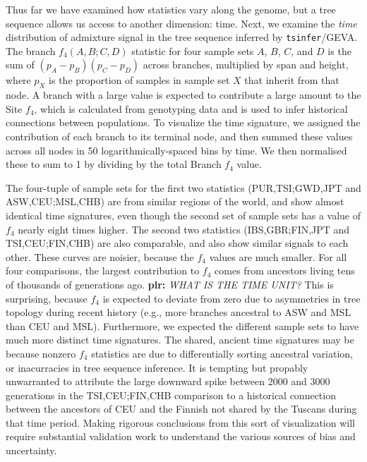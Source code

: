\documentclass{article}
\newcommand{\tsinfer}{{\texttt{tsinfer}}}
\newcommand{\plr}[1]{{\color{blue}\textbf{plr:} \it #1}}
\begin{document}
Thus far we have examined how statistics vary along the genome,
but a tree sequence allows us access to another dimension: time.
Next, we examine the \emph{time} distribution of admixture signal
in the tree sequence inferred by \tsinfer/GEVA.
The branch $f_4(A, B; C, D)$ statistic for four sample sets $A$, $B$, $C$, and $D$
is the sum of $(p_A - p_B)(p_C - p_D)$ across branches, multiplied by span and height,
where $p_X$ is the proportion of samples in sample set $X$ that inherit from that node.
A branch with a large value is expected to contribute a large amount to the Site $f_4$,
which is calculated from genotyping data
and is used to infer historical connections between populations.
To visualize the time signature, we assigned the contribution of each branch
to its terminal node,
and then summed these values across all nodes in 50 logarithmically-spaced bins by time.
We then normalised these to sum to 1 by dividing by the total Branch $f_4$ value.

The four-tuple of sample sets for the first two statistics (PUR,TSI;GWD,JPT and ASW,CEU;MSL,CHB)
are from similar regions of the world,
and show almost identical time signatures,
even though the second set of sample sets has a value of $f_4$ nearly eight times higher.
The second two statistics (IBS,GBR;FIN,JPT and TSI,CEU;FIN,CHB) are also comparable,
and also show similar signals to each other.
These curves are noisier, because the $f_4$ values are much smaller.
For all four comparisons, the largest contribution to $f_4$ comes from
ancestors living tens of thousands of generations ago.
\plr{WHAT IS THE TIME UNIT?}
This is surprising, because $f_4$ is expected to deviate from zero due to asymmetries in tree topology
during recent history (e.g., more branches ancestral to ASW and MSL than CEU and MSL).
Furthermore, we expected the different sample sets to have much more distinct time signatures.
The shared, ancient time signatures may be because nonzero $f_4$ statistics
are due to differentially sorting ancestral variation,
or inacurracies in tree sequence inference.
It is tempting but propably unwarranted to attribute the
large downward spike between 2000 and 3000 generations in the TSI,CEU;FIN,CHB comparison
to a historical connection between the ancestors of CEU and the Finnish not shared by the Tuscans
during that time period.
Making rigorous conclusions from this sort of visualization
will require substantial validation work
to understand the various sources of bias and uncertainty.
\end{document}
